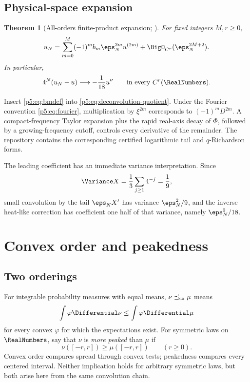 \documentclass[11pt,oneside]{article}
\numberwithin{equation}{section}
\newtheorem{theorem}{Theorem}[section]
\theoremstyle{definition}
\theoremstyle{remark}
\begin{document}
\subsection{Physical-space expansion}

\begin{theorem}[All-orders finite-product expansion; \baseline]
For fixed integers $M,r\ge0$,
\begin{equation}
 u_N
 =\sum_{m=0}^{M}(-1)^m b_m\eps_N^{2m}u^{(2m)}
 +\BigO_{C^r}(\eps_N^{2M+2}).
 \label{p5:eq:physical-expansion}
\end{equation}
In particular,
\begin{equation}
 4^N(u_N-u)\longrightarrow-\frac1{18}u''
 \qquad\text{in every }C^r(\RealNumbers).
 \label{p5:eq:leading-density}
\end{equation}
\end{theorem}

\begin{proofidea}
Insert \eqref{p5:eq:bmdef} into \eqref{p5:eq:deconvolution-quotient}.  Under the Fourier convention \eqref{p5:eq:fourier}, multiplication by $\xi^{2m}$ corresponds to $(-1)^mD^{2m}$.  A compact-frequency Taylor expansion plus the rapid real-axis decay of $\Phi$, followed by a growing-frequency cutoff, controls every derivative of the remainder.  The repository contains the corresponding certified logarithmic tail and $q$-Richardson forms.
\end{proofidea}

The leading coefficient has an immediate variance interpretation.  Since
\begin{equation}
 \Variance X=\frac13\sum_{j\ge1}4^{-j}=\frac19,
 \label{p5:eq:varX}
\end{equation}
small convolution by the tail $\eps_NX'$ has variance $\eps_N^2/9$, and the inverse heat-like correction has coefficient one half of that variance, namely $\eps_N^2/18$.

\section{Convex order and peakedness}
\label{p5:sec:order}

\subsection{Two orderings}

For integrable probability measures with equal means, $\nu\preceq_{\rm cx}\mu$ means
\[
 \int\varphi\Differential\nu\le\int\varphi\Differential\mu
\]
for every convex $\varphi$ for which the expectations exist.  For symmetric laws on $\RealNumbers$, say that $\nu$ is \emph{more peaked} than $\mu$ if
\begin{equation}
 \nu([-r,r])\ge\mu([-r,r])\qquad(r\ge0).
 \label{p5:eq:peaked}
\end{equation}
Convex order compares spread through convex tests; peakedness compares every centered interval.  Neither implication holds for arbitrary symmetric laws, but both arise here from the same convolution chain.
\end{document}
